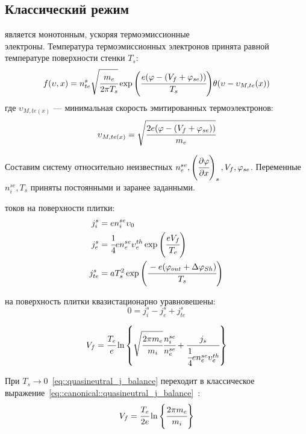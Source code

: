 \subsection{Классический режим}
 является монотонным, ускоряя термоэмиссионные \\электроны. Температура термоэмиссионных электронов 
принята равной температуре поверхности стенки $T_s$:
\begin{equation}
	f(\upsilon, x) = n_{te}^s\sqrt{\cfrac{m_e}{2\pi T_s}}\exp{\left(\cfrac{e(\varphi - (V_f + \varphi_{se}))}{T_s}\right)}\theta(\upsilon - \upsilon_{M, te}(x))
	\label{eq::themionic_distribution}
\end{equation}
где $\upsilon_{M, te(x)}$ --- минимальная скорость эмитированных термоэлектронов:
\begin{equation}
	\upsilon_{M, te(x)} = \sqrt{\cfrac{2e(\varphi - (V_f + \varphi_{se}))}{m_e}}
	\label{eq::min_thermionic_electrons_velocities}
\end{equation}

Составим систему относительно неизвестных $n_e^{se}, \left(\cfrac{\partial \varphi}{\partial x}\right)_s, V_f, \varphi_{se}$. Переменные $n_i^{se}, T_s$ 
приняты постоянными и заранее заданными.

 токов на поверхности плитки: 
\begin{subequations}
	\begin{align}
		j_i^s &= en_i^{se}\upsilon_0\\
        j_e^s &= \cfrac{1}{4}en_e^{se}\upsilon_{e}^{th}\exp{\left(\cfrac{eV_f}{T_e}\right)}\\
		j_{te}^s &= aT_s^2\exp{\left(\cfrac{-e(\varphi_{out} + \Delta\varphi_{Sh})}{T_s}\right)}
	\end{align}
	\label{eq::j_sum_classic}
\end{subequations}

 на поверхность плитки квазистационарно уравновешены:
\begin{equation}
	0 = j_i^s - j_e^s + j_{te}^s
	\label{eq::quasineutral_j_balance}
\end{equation}

\begin{equation}
    V_f = \cfrac{T_e}{e}\ln{\left\{
        \sqrt{\cfrac{2\pi m_e}{m_i}}\cfrac{n_i^{se}}{n_e^{se}} 
    + \cfrac{j_s}{\cfrac{1}{4}en_e^{se}\upsilon_e^{th}}
\right\}}
	\label{eq::quasineutral_j_balance}
\end{equation}

При $T_s \rightarrow 0$~\eqref{eq::quasineutral_j_balance} переходит в классическое выражение~\eqref{eq::canonical::quasineutral_j_balance}~\cite{chen1984introduction}:
\begin{equation}
    V_f = \cfrac{T_e}{2e}\ln{\left\{
    \cfrac{2\pi m_e}{m_i}
\right\}}
	\label{eq::canonical::quasineutral_j_balance}
\end{equation}

